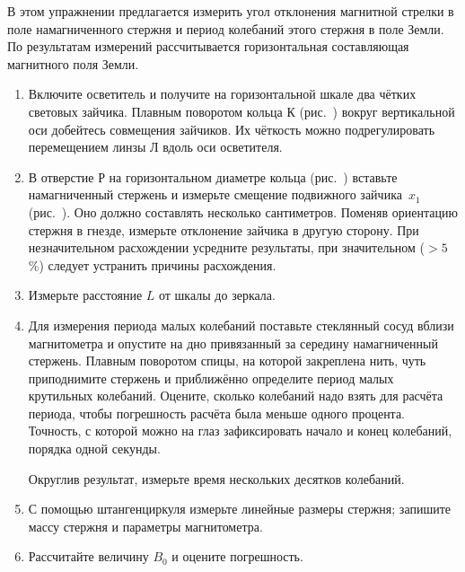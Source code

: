 \begin{lab:task}

    В этом упражнении предлагается измерить угол отклонения магнитной стрелки в поле намагниченного стержня и период
    колебаний этого стержня в поле Земли. По результатам измерений рассчитывается горизонтальная составляющая магнитного
    поля Земли.

    \begin{enumerate}
        \item Включите осветитель и получите на горизонтальной шкале два чётких световых зайчика. Плавным поворотом кольца К (рис.~)
        вокруг вертикальной оси добейтесь совмещения зайчиков. Их чёткость можно подрегулировать перемещением линзы Л вдоль оси
        осветителя.

        \item В отверстие Р на горизонтальном диаметре кольца (рис.~) вставьте намагниченный стержень и измерьте смещение подвижного
        зайчика~$x_1$ (рис.~). Оно должно составлять несколько сантиметров. Поменяв ориентацию стержня в гнезде, измерьте
        отклонение зайчика в другую сторону. При незначительном расхождении усредните результаты, при значительном ($>5$\%)
        следует устранить причины расхождения.

        \item Измерьте расстояние $L$ от шкалы до зеркала.

        \item Для измерения периода малых колебаний поставьте стеклянный сосуд вблизи магнитометра и опустите на дно привязанный за
        середину намагниченный стержень. Плавным поворотом спицы, на которой закреплена нить, чуть приподнимите стержень и
        приближённо определите период малых крутильных колебаний. Оцените, сколько колебаний надо взять для расчёта периода,
        чтобы погрешность расчёта была меньше одного процента. Точность, с которой можно на глаз зафиксировать начало и конец
        колебаний, порядка одной секунды.

        Округлив результат, измерьте время нескольких десятков колебаний.

        \item С помощью штангенциркуля измерьте линейные размеры стержня; запишите массу стержня и параметры магнитометра.

        \item Рассчитайте величину $B_0$ и оцените погрешность.
    \end{enumerate}
\end{lab:task}


